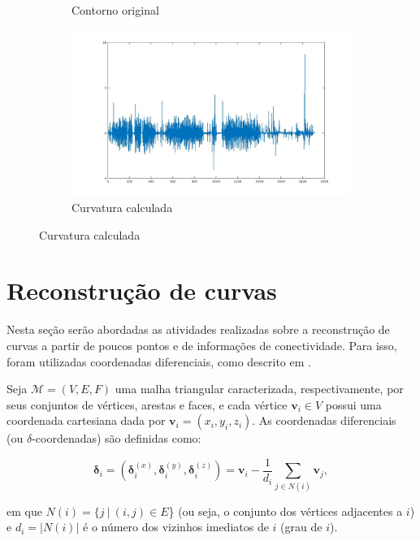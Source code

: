 \begin{figure}[htb]
\begin{subfigure}[b]{0.22\textwidth}
		\caption{Contorno original}
	\end{subfigure}
	\begin{subfigure}[b]{0.73\textwidth}
		\centering
		\includegraphics[width=1\textwidth]{img/curvatura.jpg}
		\caption{Curvatura calculada}
	\end{subfigure}
	\label{img:curv}
\end{figure}

\section{Reconstrução de curvas}\label{sec:laplacebeltrami}

Nesta seção serão abordadas as atividades realizadas sobre a reconstrução de curvas a partir de poucos pontos e de informações de conectividade. Para isso, foram utilizadas coordenadas diferenciais, como descrito em .

Seja $\mathcal{M} = (V, E, F)$ uma malha triangular caracterizada, respectivamente, por seus conjuntos de vértices, arestas e faces, e cada vértice $\mathbf{v}_i \in V$ possui uma coordenada cartesiana dada por $\mathbf{v}_i = (x_i,y_i,z_i)$. As coordenadas diferenciais (ou $\delta$-coordenadas) são definidas como:

\begin{equation}
	\mathbf{\delta}_i = (\mathbf{\delta}_i^{(x)}, \mathbf{\delta}_i^{(y)}, \mathbf{\delta}_i^{(z)}) = \mathbf{v}_i - \frac{1}{d_i} \sum_{j \in N(i)} \mathbf{v}_j,
	\label{eq_delta}
\end{equation}

\noindent em que $N(i) = \{j\ |\ (i,j) \in E$\} (ou seja, o conjunto dos vértices adjacentes a $i$) e $d_i = |N(i)|$ é o número dos vizinhos imediatos de $i$ (grau de $i$).

